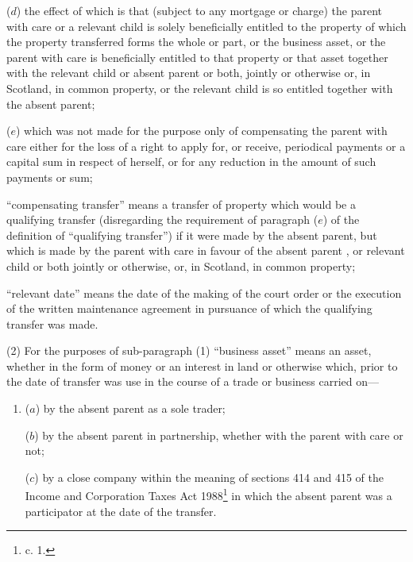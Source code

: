 \documentclass[12pt,a4paper]{article}
\begin{document}
\begin{enumerate}
\begin{enumerate}
($d$) the effect of which is that (subject to any mortgage or charge) the parent with care or a relevant child is solely beneficially entitled to the property of which the property transferred forms the whole or part, or the business asset, or the parent with care is beneficially entitled to that property or that asset together with the relevant child or absent parent or both, jointly or otherwise or, in Scotland, in common property, or the relevant child is so entitled together with the absent parent;


($e$) which was not made for the purpose only of compensating the parent with care either for the loss of a right to apply for, or receive, periodical payments or a capital sum in respect of herself, or for any reduction in the amount of such payments or sum;
\end{enumerate}

“compensating transfer” means a transfer of property which would be a qualifying transfer (disregarding the requirement of paragraph ($e$) of the definition of “qualifying transfer”) if it were made by the absent parent, but which is made by the parent with care in favour of the absent parent%
, or  %
relevant child
or both jointly or otherwise, or, in Scotland, in common property;  %

“relevant date” means the date of the making of the court order or the execution of the written maintenance agreement in pursuance of which the qualifying transfer was made.
\end{enumerate}

(2) For the purposes of sub-paragraph (1) “business asset” means an asset, whether in the form of money or an interest in land or otherwise which, prior to the date of transfer was use in the course of a trade or business carried on—
\begin{enumerate}\item[]
($a$) by the absent parent as a sole trader;

($b$) by the absent parent in partnership, whether with the parent with care or not;

($c$) by a close company within the meaning of sections 414 and 415 of the Income and Corporation Taxes Act 1988\footnote{ c. 1.} in which the absent parent was a participator at the date of the transfer.
\end{enumerate}
\end{document}
